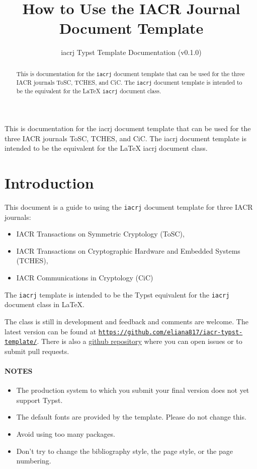\documentclass{iacrj}
\title[running  = {The iacrj document template}]{How to Use the IACR Journal Document Template}
\subtitle{iacrj Typst Template Documentation (v0.1.0)}
\begin{document}
\maketitle


\begin{abstract}
  This is documentation for the \texttt{iacrj} document template that can be used for the three IACR journals ToSC, TCHES, and CiC.
  The \texttt{iacrj} document template is intended to be the equivalent for the LaTeX \texttt{iacrj} document class.
\end{abstract}
\begin{textabstract}
  This is documentation for the iacrj document template that can be used for the three IACR journals ToSC, TCHES, and CiC.
  The iacrj document template is intended to be the equivalent for the LaTeX iacrj document class.
\end{textabstract}
\section*{Introduction}

This document is a guide to using the \texttt{iacrj} document template for three IACR journals:
\begin{itemize}
\item IACR Transactions on Symmetric Cryptology (ToSC),
\item IACR Transactions on Cryptographic Hardware and Embedded Systems (TCHES),
\item IACR Communications in Cryptology (CiC)
\end{itemize}
The \texttt{iacrj} template is intended to be the Typst equivalent for the \texttt{iacrj} document class in LaTeX.

The class is still in development and feedback and comments are welcome.
The latest version can be found at \href{https://github.com/eliana817/iacr-typst-template/}{\texttt{https://github.com/eliana817/iacr-typst-template/}}.
There is also a \href{https://github.com/IACR/latex}{github repository} where you can open issues or to submit pull requests.

\paragraph*{NOTES}
\begin{itemize}
\item The production system to which you submit your final version does not yet support Typst.
\item The default fonts are provided by the template.
      Please do not change this.
\item Avoid using too many packages.
\item Don't try to change the bibliography style, the page style, or the page numbering.
\end{itemize}


\end{document}
